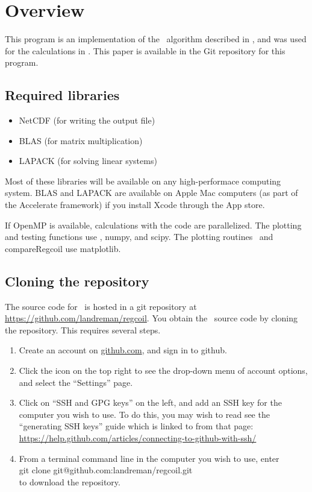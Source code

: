\chapter{Overview}

This program is an implementation of the \regcoil~algorithm described in \cite{regcoilPaper},
and was used for the calculations in \cite{PaperII}.
This paper is available in the Git repository for this program.



\section{Required libraries}

\begin{itemize}

\item {\ttfamily NetCDF} (for writing the output file)
\item {\ttfamily BLAS} (for matrix multiplication)
\item {\ttfamily LAPACK} (for solving linear systems)

\end{itemize}

Most of these libraries will be available on any high-performace computing system. {\ttfamily BLAS} and {\ttfamily LAPACK}
are available on Apple Mac computers (as part of the Accelerate framework) if you install Xcode through the App store.

If {\ttfamily OpenMP} is available, calculations with the code are parallelized.
The plotting and testing functions use \python,
{\ttfamily numpy}, and {\ttfamily scipy}.
The plotting routines \regcoilPlot~and {\ttfamily compareRegcoil} use {\ttfamily matplotlib}.

\section{Cloning the repository}

The source code for \regcoil~is hosted in a {\ttfamily git} repository at
\url{https://github.com/landreman/regcoil}.
You obtain the \regcoil~source code by cloning the repository. This requires several steps.

\begin{enumerate}
\item Create an account on \url{github.com}, and sign in to {\ttfamily github}.
\item Click the icon on the top right to see the drop-down menu of account options, and select the ``Settings'' page.
\item Click on ``SSH and GPG keys'' on the left, and add an SSH key for the computer you wish to use. To do this, you may wish to read see the ``generating SSH keys'' guide which is linked to from that page: \url{https://help.github.com/articles/connecting-to-github-with-ssh/}
\item From a terminal command line in the computer you wish to use, enter\\
{\ttfamily git clone git@github.com:landreman/regcoil.git}\\
 to download the repository.
\end{enumerate}

